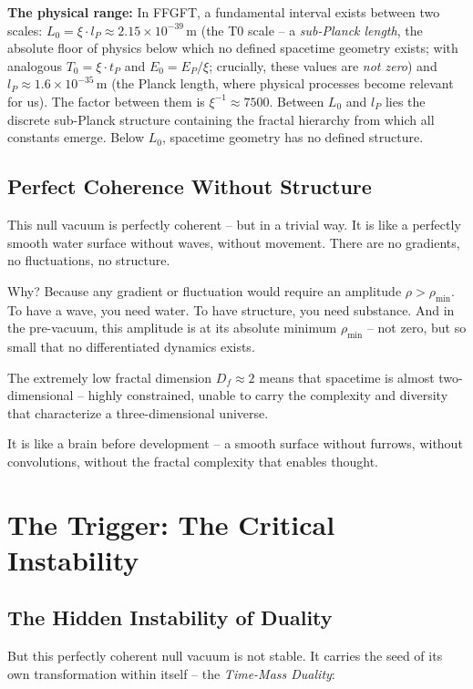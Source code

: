 	\textbf{The physical range:} In FFGFT, a fundamental interval exists between two scales: $L_0 = \xi \cdot l_P \approx 2.15 \times 10^{-39}\,$m (the T0 scale -- a \textit{sub-Planck length}, the absolute floor of physics below which no defined spacetime geometry exists; with analogous $T_0 = \xi \cdot t_P$ and $E_0 = E_P / \xi$; crucially, these values are \textit{not zero}) and $l_P \approx 1.6 \times 10^{-35}\,$m (the Planck length, where physical processes become relevant for us). The factor between them is $\xi^{-1} \approx 7500$. Between $L_0$ and $l_P$ lies the discrete sub-Planck structure containing the fractal hierarchy from which all constants emerge. Below $L_0$, spacetime geometry has no defined structure.
	
	\subsection{Perfect Coherence Without Structure}
	
	This null vacuum is perfectly coherent -- but in a trivial way. It is like a perfectly smooth water surface without waves, without movement. There are no gradients, no fluctuations, no structure.
	
	Why? Because any gradient or fluctuation would require an amplitude $\rho > \rho_{\min}$. To have a wave, you need water. To have structure, you need substance. And in the pre-vacuum, this amplitude is at its absolute minimum $\rho_{\min}$ -- not zero, but so small that no differentiated dynamics exists.
	
	The extremely low fractal dimension $D_f \approx 2$ means that spacetime is almost two-dimensional -- highly constrained, unable to carry the complexity and diversity that characterize a three-dimensional universe.
	
	It is like a brain before development -- a smooth surface without furrows, without convolutions, without the fractal complexity that enables thought.
	
	\section{The Trigger: The Critical Instability}
	
	\subsection{The Hidden Instability of Duality}
	
	But this perfectly coherent null vacuum is not stable. It carries the seed of its own transformation within itself -- the \textit{Time-Mass Duality}:
	
